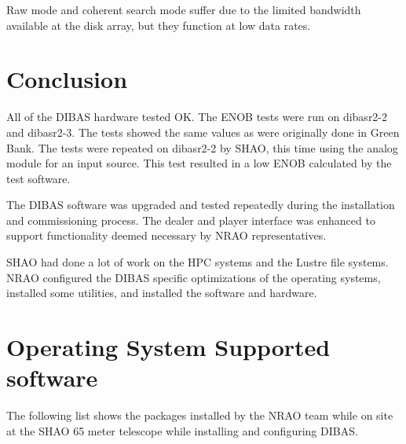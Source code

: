 \documentclass[11pt]{article}
\begin{document}
Raw mode and coherent search mode suffer due to the limited bandwidth
available at the disk array, but they function at low data rates.


\section{Conclusion}
All of the DIBAS hardware tested OK.  The ENOB tests were run on
dibasr2-2 and dibasr2-3.  The tests showed the same values as were
originally done in Green Bank.  The tests were repeated on dibasr2-2
by SHAO, this time using the analog module for an input source.  This
test resulted in a low ENOB calculated by the test software.

The DIBAS software was upgraded and tested repeatedly during the
installation and commissioning process.  The dealer and player
interface was enhanced to support functionality deemed necessary by
NRAO representatives.

SHAO had done a lot of work on the HPC systems and the Lustre file
systems.  NRAO configured the DIBAS specific optimizations of the
operating systems, installed some utilities, and installed the
software and hardware.


\appendix
\section{Operating System Supported software}
\label{app:yum}
The following list shows the packages installed by the NRAO team while
on site at the SHAO 65 meter telescope while installing and
configuring DIBAS.
\end{document}
